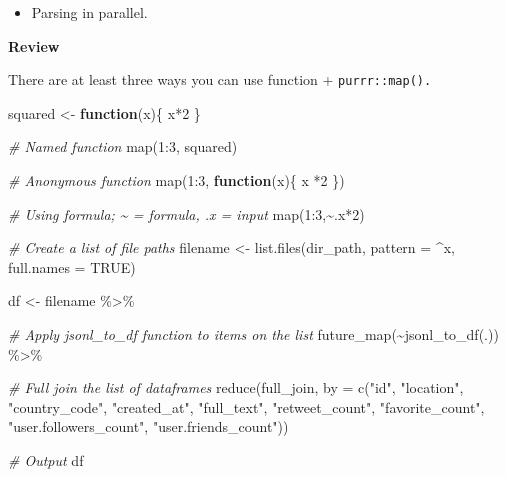 \documentclass[
]{book}
\newenvironment{Shaded}{\begin{snugshade}}{\end{snugshade}}
\newcommand{\AttributeTok}[1]{\textcolor[rgb]{0.77,0.63,0.00}{#1}}
\newcommand{\CommentTok}[1]{\textcolor[rgb]{0.56,0.35,0.01}{\textit{#1}}}
\newcommand{\ConstantTok}[1]{\textcolor[rgb]{0.00,0.00,0.00}{#1}}
\newcommand{\ControlFlowTok}[1]{\textcolor[rgb]{0.13,0.29,0.53}{\textbf{#1}}}
\newcommand{\DecValTok}[1]{\textcolor[rgb]{0.00,0.00,0.81}{#1}}
\newcommand{\FunctionTok}[1]{\textcolor[rgb]{0.00,0.00,0.00}{#1}}
\newcommand{\NormalTok}[1]{#1}
\newcommand{\OtherTok}[1]{\textcolor[rgb]{0.56,0.35,0.01}{#1}}
\newcommand{\SpecialCharTok}[1]{\textcolor[rgb]{0.00,0.00,0.00}{#1}}
\newcommand{\StringTok}[1]{\textcolor[rgb]{0.31,0.60,0.02}{#1}}
\providecommand{\tightlist}{%
  \setlength{\itemsep}{0pt}\setlength{\parskip}{0pt}}
\begin{document}
\begin{itemize}
\tightlist
\item
  Parsing in parallel.
\end{itemize}

\textbf{Review}

There are at least three ways you can use function + \texttt{purrr::map().}

\begin{Shaded}
\begin{Highlighting}[]
\NormalTok{squared }\OtherTok{\textless{}{-}} \ControlFlowTok{function}\NormalTok{(x)\{}
\NormalTok{  x}\SpecialCharTok{*}\DecValTok{2} 
\NormalTok{\}}

\CommentTok{\# Named function }
\FunctionTok{map}\NormalTok{(}\DecValTok{1}\SpecialCharTok{:}\DecValTok{3}\NormalTok{, squared)}

\CommentTok{\# Anonymous function }
\FunctionTok{map}\NormalTok{(}\DecValTok{1}\SpecialCharTok{:}\DecValTok{3}\NormalTok{, }\ControlFlowTok{function}\NormalTok{(x)\{ x }\SpecialCharTok{*}\DecValTok{2}\NormalTok{ \})}

\CommentTok{\# Using formula; \textasciitilde{} = formula, .x = input }
\FunctionTok{map}\NormalTok{(}\DecValTok{1}\SpecialCharTok{:}\DecValTok{3}\NormalTok{,}\SpecialCharTok{\textasciitilde{}}\NormalTok{.x}\SpecialCharTok{*}\DecValTok{2}\NormalTok{)}
\end{Highlighting}
\end{Shaded}

\begin{Shaded}
\begin{Highlighting}[]
\CommentTok{\# Create a list of file paths }
\NormalTok{filename }\OtherTok{\textless{}{-}} \FunctionTok{list.files}\NormalTok{(dir\_path,}
          \AttributeTok{pattern =} \StringTok{\textquotesingle{}\^{}x\textquotesingle{}}\NormalTok{,}
          \AttributeTok{full.names =} \ConstantTok{TRUE}\NormalTok{)}

\NormalTok{df }\OtherTok{\textless{}{-}}\NormalTok{ filename }\SpecialCharTok{\%\textgreater{}\%}

\CommentTok{\# Apply jsonl\_to\_df function to items on the list}
\FunctionTok{future\_map}\NormalTok{(}\SpecialCharTok{\textasciitilde{}}\FunctionTok{jsonl\_to\_df}\NormalTok{(.)) }\SpecialCharTok{\%\textgreater{}\%}

\CommentTok{\# Full join the list of dataframes}
\FunctionTok{reduce}\NormalTok{(full\_join,}
       \AttributeTok{by =} \FunctionTok{c}\NormalTok{(}\StringTok{"id"}\NormalTok{,}
              \StringTok{"location"}\NormalTok{,}
              \StringTok{"country\_code"}\NormalTok{,}
              \StringTok{"created\_at"}\NormalTok{,}
              \StringTok{"full\_text"}\NormalTok{,}
              \StringTok{"retweet\_count"}\NormalTok{,}
              \StringTok{"favorite\_count"}\NormalTok{,}
              \StringTok{"user.followers\_count"}\NormalTok{,}
              \StringTok{"user.friends\_count"}\NormalTok{))}

\CommentTok{\# Output}
\NormalTok{df}
\end{Highlighting}
\end{Shaded}
\end{document}
